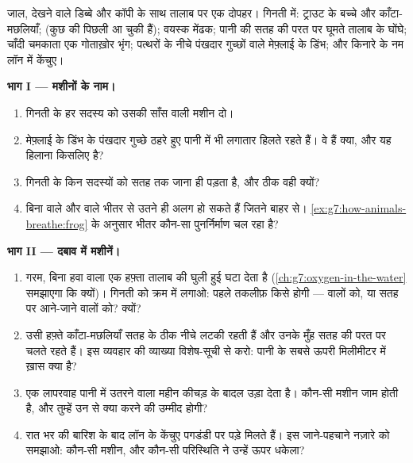\begin{problem}[{सप्ताहांत समस्या --- एक तालाब, और काम पर हर
मशीन}]\label{pb:g7:how-animals-breathe:1}
जाल, देखने वाले डिब्बे और कॉपी के साथ तालाब पर एक दोपहर। गिनती में:
ट्राउट के बच्चे और काँटा-मछलियाँ;  (कुछ की पिछली  आ चुकी
हैं); वयस्क मेंढक; पानी की सतह की परत पर घूमते तालाब के घोंघे; चाँदी
चमकाता एक गोताख़ोर भृंग; पत्थरों के नीचे पंखदार गुच्छों वाले मेफ़्लाई के
डिंभ; और किनारे के नम लॉन में केंचुए।

\medskip\noindent\textbf{भाग I --- मशीनों के नाम।}
\begin{enumerate}
  \item गिनती के हर सदस्य को उसकी साँस वाली मशीन दो।
  \item मेफ़्लाई के डिंभ के पंखदार गुच्छे ठहरे हुए पानी में भी लगातार
        हिलते रहते हैं। वे हैं क्या, और यह हिलाना किसलिए है?
  \item गिनती के किन सदस्यों को सतह तक जाना ही पड़ता है, और ठीक वही
        क्यों?
  \item बिना  वाले  और  वाले भीतर से उतने ही अलग हो
        सकते हैं जितने बाहर से।
        \cref{ex:g7:how-animals-breathe:frog} के अनुसार भीतर कौन-सा
        पुनर्निर्माण चल रहा है?
\end{enumerate}

\medskip\noindent\textbf{भाग II --- दबाव में मशीनें।}
\begin{enumerate}[resume]
  \item गरम, बिना हवा वाला एक हफ़्ता तालाब की घुली हुई  घटा देता
        है (\cref{ch:g7:oxygen-in-the-water} समझाएगा कि क्यों)। गिनती
        को क्रम में लगाओ: पहले तकलीफ़ किसे होगी ---  वालों को, या
        सतह पर आने-जाने वालों को? क्यों?
  \item उसी हफ़्ते काँटा-मछलियाँ सतह के ठीक नीचे लटकी रहती हैं और उनके
        मुँह सतह की परत पर चलते रहते हैं। इस व्यवहार की व्याख्या
        विशेष-सूची से करो: पानी के सबसे ऊपरी मिलीमीटर में ख़ास क्या है?
  \item एक लापरवाह पानी में उतरने वाला महीन कीचड़ के बादल उड़ा देता है।
        कौन-सी मशीन जाम होती है, और तुम्हें उन  से क्या करने की
        उम्मीद होगी?
  \item रात भर की बारिश के बाद लॉन के केंचुए पगडंडी पर पड़े मिलते हैं।
        इस जाने-पहचाने नज़ारे को समझाओ: कौन-सी मशीन, और कौन-सी
        परिस्थिति ने उन्हें ऊपर धकेला?
\end{enumerate}


\end{problem}
